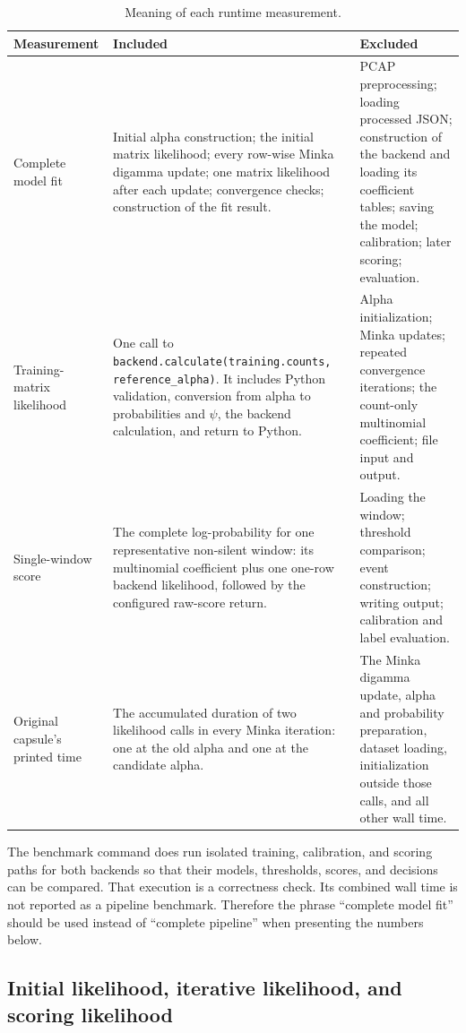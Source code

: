 \documentclass[11pt]{article}
\begin{document}
\begin{table}[htbp]
\centering
\small
\caption{Meaning of each runtime measurement.}
\label{tab:timing-boundaries}
\begin{tabular}{p{}p{}p{}}
\toprule
Measurement & Included & Excluded \\
\midrule
Complete model fit & Initial alpha construction; the initial matrix
likelihood; every row-wise Minka digamma update; one matrix likelihood after
each update; convergence checks; construction of the fit result. & PCAP
preprocessing; loading processed JSON; construction of the backend and loading
its coefficient tables; saving the model; calibration; later scoring;
evaluation. \\
\addlinespace
Training-matrix likelihood & One call to
\texttt{backend.calculate(training.counts, reference\_alpha)}. It includes
Python validation, conversion from alpha to probabilities and \(\psi\), the
backend calculation, and return to Python. & Alpha initialization; Minka
updates; repeated convergence iterations; the count-only multinomial
coefficient; file input and output. \\
\addlinespace
Single-window score & The complete log-probability for one representative
non-silent window: its multinomial coefficient plus one one-row backend
likelihood, followed by the configured raw-score return. & Loading the window;
threshold comparison; event construction; writing output; calibration and
label evaluation. \\
\addlinespace
Original capsule's printed time & The accumulated duration of two likelihood
calls in every Minka iteration: one at the old alpha and one at the candidate
alpha. & The Minka digamma update, alpha and probability preparation, dataset
loading, initialization outside those calls, and all other wall
time. \\
\bottomrule
\end{tabular}
\end{table}

The benchmark command does run isolated training, calibration, and scoring
paths for both backends so that their models, thresholds, scores, and decisions
can be compared. That execution is a correctness check. Its combined wall time
is not reported as a pipeline benchmark. Therefore the phrase ``complete model
fit'' should be used instead of ``complete pipeline'' when presenting the
numbers below.

\subsection{Initial likelihood, iterative likelihood, and scoring likelihood}
\end{document}
